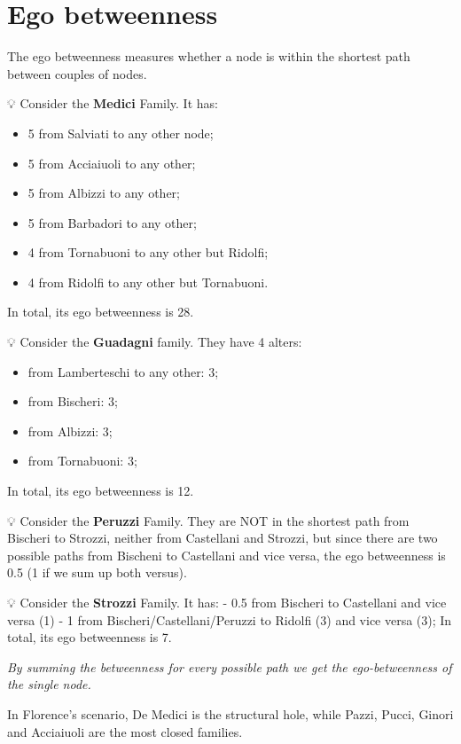 \documentclass[
  notitlepage,
  onecolumn,
  openany]{book}
\providecommand{\tightlist}{%
  \setlength{\itemsep}{0pt}\setlength{\parskip}{0pt}}
\begin{document}
\hypertarget{ego-betweenness}{%
\section{Ego betweenness}\label{ego-betweenness}}

The ego betweenness measures whether a node is within the shortest path between couples of nodes.

💡 Consider the \textbf{Medici} Family. It has:

\begin{itemize}
\tightlist
\item
  5 from Salviati to any other node;
\item
  5 from Acciaiuoli to any other;
\item
  5 from Albizzi to any other;
\item
  5 from Barbadori to any other;
\item
  4 from Tornabuoni to any other but Ridolfi;
\item
  4 from Ridolfi to any other but Tornabuoni.
\end{itemize}

In total, its ego betweenness is 28.

💡 Consider the \textbf{Guadagni} family. They have 4 alters:

\begin{itemize}
\tightlist
\item
  from Lamberteschi to any other: 3;
\item
  from Bischeri: 3;
\item
  from Albizzi: 3;
\item
  from Tornabuoni: 3;
\end{itemize}

In total, its ego betweenness is 12.

💡 Consider the \textbf{Peruzzi} Family. They are NOT in the shortest path from Bischeri to Strozzi, neither from Castellani and Strozzi, but since there are two possible paths from Bischeni to Castellani and vice versa, the ego betweenness is 0.5 (1 if we sum up both versus).

💡 Consider the \textbf{Strozzi} Family. It has:
- 0.5 from Bischeri to Castellani and vice versa (1)
- 1 from Bischeri/Castellani/Peruzzi to Ridolfi (3) and vice versa (3);
In total, its ego betweenness is 7.

\emph{By summing the betweenness for every possible path we get the ego-betweenness of the single node.}

In Florence's scenario, De Medici is the structural hole, while Pazzi, Pucci, Ginori and Acciaiuoli are the most closed families.
\end{document}
